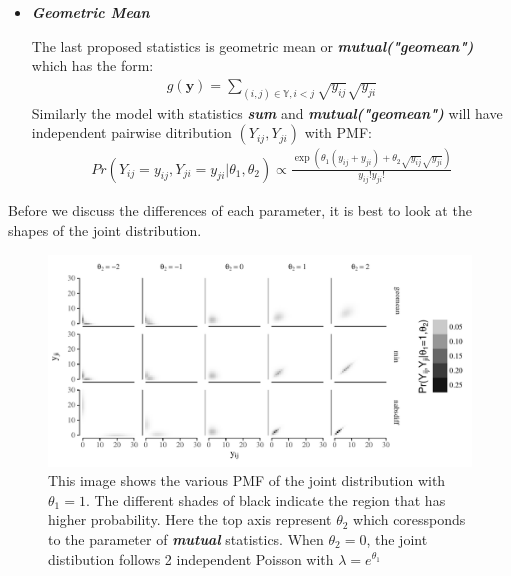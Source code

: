 \documentclass[12pt,a4paper,twoside,openany]{book}\usepackage[]{graphicx}\usepackage[]{color}
\makeatletter
\def\maxwidth{ %
  \ifdim\Gin@nat@width>\linewidth
    \linewidth
  \else
    \Gin@nat@width
  \fi
}
\newenvironment{knitrout}{}{} %
\makeatother
\begin{document}
\begin{itemize}
\item \textit{\textbf{Geometric Mean}}

The last proposed statistics is geometric mean or \textit{\textbf{mutual("geomean")}} which has the form:
\begin{align}
g(\bm{y}) = \sum_{(i,j)\in\mathbb{Y},i<j} \sqrt{y_{ij}}\sqrt{y_{ji}} 
\end{align}
Similarly the model with statistics \textit{\textbf{sum}} and \textit{\textbf{mutual("geomean")}} will have independent pairwise ditribution $(Y_{ij},Y_{ji})$ with PMF:
\begin{align*}
Pr(Y_{ij}=y_{ij},Y_{ji}=y_{ji}| \theta_1,\theta_2) \propto \frac{\exp(\theta_1 (y_{ij}+y_{ji}) + \theta_2 \sqrt{y_{ij}}\sqrt{y_{ji}})}{y_{ij}!y_{ji}!} 
\end{align*}
\end{itemize}
Before we discuss the differences of each parameter, it is best to look at the  shapes of the joint distribution. 
\begin{figure}[H]
\begin{knitrout}
\color{fgcolor}

{\centering \includegraphics[width=\maxwidth]{figure/unnamed-chunk-4-1} 

}



\end{knitrout}
\caption [Joint distribution with mutual statistics]{This image shows the various PMF of the joint distribution with $\theta_1 =1 $. The different shades of black indicate the region that has higher probability. Here the top axis represent $\theta_2$ which coressponds to the parameter of \textit{\textbf{mutual}} statistics. When $\theta_2 = 0$, the joint distibution follows 2 independent Poisson with $\lambda = e^{\theta_1}$}
\end{figure}
\end{document}

